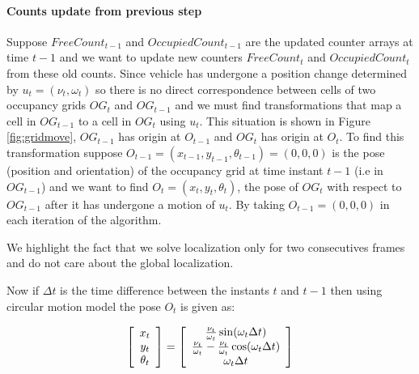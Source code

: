 \paragraph{Counts update from previous step} Suppose $FreeCount_{t-1}$ and  $OccupiedCount_{t-1}$ are the
updated counter arrays at time $t-1$ and we want to update new counters $FreeCount_t$ and $OccupiedCount_t$
from these old counts. Since vehicle has undergone a position change determined by $u_t=(\nu_t, \omega_t)$
so there is no direct correspondence between cells of two occupancy grids $OG_t$ and $OG_{t-1}$ and we
must find transformations that map a cell in  $OG_{t-1}$ to a cell in $OG_{t}$ using $u_t$. This situation is
shown in Figure \ref{fig:gridmove}, $OG_{t-1}$ has origin at $O_{t-1}$ and $OG_t$ has origin at $O_t$. To find this transformation suppose $O_{t-1}=(x_{t-1}, y_{t-1}, \theta_{t-1}) = (0,0,0)$ is the pose (position and orientation) of the occupancy grid at time instant $t-1$ (i.e in $OG_{t-1}$) and we want to find $O_t=(x_t, y_t, \theta_t)$, the pose of $OG_t$ with respect to $OG_{t-1}$ after it has undergone a motion of $u_t$. By taking $O_{t-1}=(0,0,0)$ in each iteration of the algorithm.

We highlight the fact that we solve localization only for two consecutives frames and do not care about the global localization. 

Now if $\Delta t$ is the time difference between the instants $t$ and $t-1$ then using circular motion model the pose $O_t$ is given as:

\begin{equation}
\left[\begin{array}{c}x_t \\ y_t\\ \theta_t \end{array} \right] = 
\left[\begin{array}{c} {\nu_t \over \omega_t} \sin(\omega_t \Delta t) \\ {\nu_t \over \omega_t} - {\nu_t \over \omega_t} \cos(\omega_t \Delta t) \\ \omega_t \Delta t \end{array}\right]
\end{equation}

